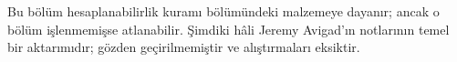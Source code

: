 \documentclass[../../../include/open-logic-chapter]{subfiles}
\begin{document}
\begin{editorial}
  Bu bölüm hesaplanabilirlik kuramı bölümündeki malzemeye dayanır; ancak o
  bölüm işlenmemişse atlanabilir. Şimdiki hâli Jeremy Avigad'ın notlarının
  temel bir aktarımıdır; gözden geçirilmemiştir ve alıştırmaları eksiktir.
\end{editorial}












\OLEndChapterHook
\end{document}
